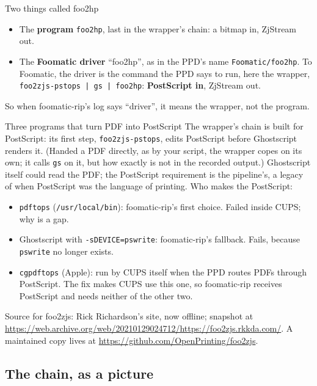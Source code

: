 \documentclass[11pt,a4paper]{article}
\begin{document}
\begin{insight}{Two things called foo2hp}
\begin{itemize}[nosep]
  \item The \textbf{program} \texttt{foo2hp}, last in the wrapper's chain: a bitmap in, ZjStream out.
  \item The \textbf{Foomatic driver} ``foo2hp'', as in the PPD's name \texttt{Foomatic/foo2hp}. To Foomatic, the driver is the command the PPD says to run, here the wrapper, \texttt{foo2zjs-pstops | gs | foo2hp}: \textbf{PostScript in}, ZjStream out.
\end{itemize}
So when foomatic-rip's log says ``driver'', it means the wrapper, not the program.
\end{insight}

\begin{insight}{Three programs that turn PDF into PostScript}
The wrapper's chain is built for PostScript: its first step, \texttt{foo2zjs-pstops}, edits PostScript before Ghostscript renders it. (Handed a PDF directly, as by your script, the wrapper copes on its own; it calls \texttt{gs} on it, but how exactly is not in the recorded output.) Ghostscript itself could read the PDF; the PostScript requirement is the pipeline's, a legacy of when PostScript was the language of printing. Who makes the PostScript:
\begin{itemize}[nosep]
  \item \texttt{pdftops} (\texttt{/usr/local/bin}): foomatic-rip's first choice. Failed inside CUPS; why is a gap.
  \item Ghostscript with \texttt{-sDEVICE=pswrite}: foomatic-rip's fallback. Fails, because \texttt{pswrite} no longer exists.
  \item \texttt{cgpdftops} (Apple): run by CUPS itself when the PPD routes PDFs through PostScript. The fix makes CUPS use this one, so foomatic-rip receives PostScript and needs neither of the other two.
\end{itemize}
\end{insight}

Source for foo2zjs: Rick Richardson's site, now offline; snapshot at \url{https://web.archive.org/web/20210129024712/https://foo2zjs.rkkda.com/}. A maintained copy lives at \url{https://github.com/OpenPrinting/foo2zjs}.

\subsection{The chain, as a picture}\label{sec:chain}
\end{document}
